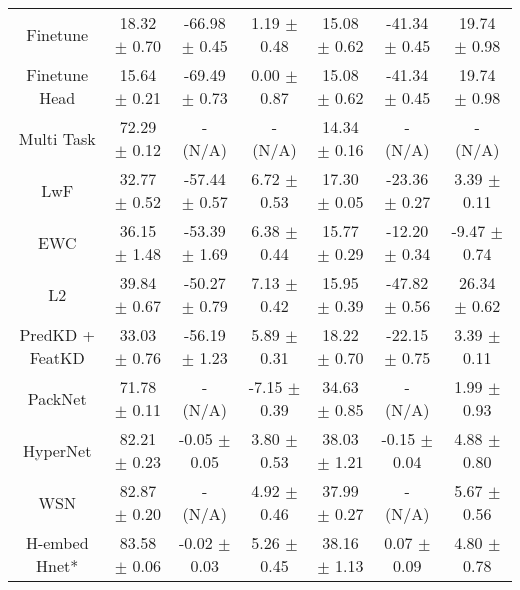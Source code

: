 \begin{table*}[!t]
\begin{tabular}{c | c| c| c |c|c|c }
Finetune & 18.32 $\pm$ 0.70 & -66.98 $\pm$ 0.45 & 1.19 $\pm$ 0.48 & 15.08 $\pm$ 0.62 & -41.34 $\pm$ 0.45 & 19.74 $\pm$ 0.98 \\
          Finetune Head & 15.64 $\pm$ 0.21  & -69.49 $\pm$ 0.73 & 0.00 $\pm$ 0.87 & 15.08 $\pm$ 0.62 & -41.34 $\pm$ 0.45 & 19.74 $\pm$ 0.98 \\
          Multi Task & 72.29 $\pm$ 0.12 &- (N/A) &- (N/A) &  14.34 $\pm$ 0.16 &- (N/A) &- (N/A) \\
          \midrule
	LwF & 32.77 $\pm$ 0.52 & -57.44 $\pm$ 0.57 & 6.72 $\pm$ 0.53 & 17.30 $\pm$ 0.05 & -23.36 $\pm$ 0.27 & 3.39 $\pm$ 0.11\\
         EWC & 36.15 $\pm$ 1.48 & -53.39 $\pm$ 1.69 & 6.38 $\pm$ 0.44 & 15.77 $\pm$ 0.29 & -12.20 $\pm$ 0.34 & -9.47 $\pm$ 0.74 \\
         L2 & 39.84 $\pm$ 0.67 & -50.27 $\pm$ 0.79 & 7.13 $\pm$ 0.42 & 15.95 $\pm$ 0.39 & -47.82 $\pm$ 0.56 & 26.34 $\pm$ 0.62 \\
	PredKD + FeatKD & 33.03 $\pm$ 0.76 & -56.19 $\pm$ 1.23 & 5.89 $\pm$ 0.31 & 18.22 $\pm$ 0.70 & -22.15 $\pm$ 0.75 & 3.39 $\pm$ 0.11 \\
          \midrule
          PackNet & 71.78 $\pm$ 0.11 &  - (N/A) & -7.15 $\pm$ 0.39 & 34.63 $\pm$ 0.85 & - (N/A) & 1.99 $\pm$ 0.93 \\
          HyperNet & 82.21 $\pm$ 0.23  & -0.05 $\pm$ 0.05 & 3.80 $\pm$ 0.53 & 38.03 $\pm$ 1.21 & -0.15 $\pm$ 0.04 & 4.88 $\pm$ 0.80\\
          WSN & 82.87 $\pm$ 0.20 & - (N/A) & 4.92 $\pm$ 0.46 & 37.99 $\pm$ 0.27 & - (N/A) & 5.67 $\pm$ 0.56 \\
          \midrule
        H-embed Hnet* & 83.58 $\pm$ 0.06 &  -0.02 $\pm$ 0.03 &  5.26 $\pm$ 0.45 & 38.16 $\pm$ 1.13 & 0.07 $\pm$ 0.09 & 4.80 $\pm$ 0.78\\
          \bottomrule
    \end{tabular}
    

\end{table*}
